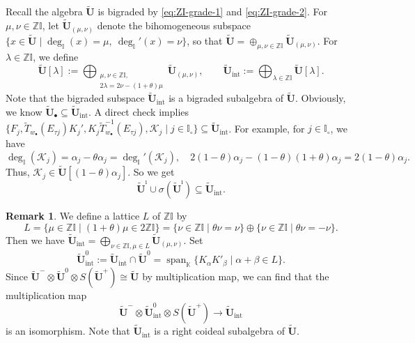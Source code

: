 \documentclass[a4paper,reqno,12pt]{amsart}
\numberwithin{equation}{section}
\theoremstyle{definition}
\newtheorem{remark}[proposition]{Remark}
\theoremstyle{plain}
\theoremstyle{definition}
\def\K{\mathbb K}
\def\Z{\mathbb Z}
\def\I{\mathbb I}
\def\wI{\I_\circ}
\def\bw{w_\bullet}
\def\tU{\widetilde{\mathbf U}}
\def\tUi{\widetilde{\mathbf U}^{\imath}}
\def \tbU{\tU_{\bullet}}
\def\tTD{\widetilde T}
\def\cK{\mathcal K}
\newcommand{\Span}{\operatorname{span}}
\begin{document}
Recall the algebra $\tU$ is bigraded by \eqref{eq:ZI-grade-1} and \eqref{eq:ZI-grade-2}. For $\mu,\nu\in\Z\I$, let $\tU_{(\mu,\nu)}$ denote the bihomogeneous subspace $\{x\in\tU\mid \deg_\I(x)=\mu,\ \deg_\I'(x)=\nu\}$, so that $\tU=\oplus_{\mu,\nu\in\Z\I} \tU_{(\mu,\nu)}$. For $\lambda\in\Z\I$, we define
\begin{equation}\label{eq:sum of bigraded subspace and int subalge}
  \tU[\lambda]:=\bigoplus_{\substack{\mu,\nu\in\Z\I,\\2\lambda=2\nu-(1+\theta)\mu}}\tU_{(\mu,\nu)},\qquad \tU_{\text{int}}:=\bigoplus_{\lambda\in\Z\I}\tU[\lambda].
\end{equation}
Note that the bigraded subspace $\tU_{\text{int}}$ is a bigraded subalgebra of $\tU$. Obviously, we know $\tbU\subseteq\tU_{\text{int}}$. A direct check implies $\{F_j,\tTD_{\bw}( E_{\tau j}) K_j',K_j\tTD_{\bw}^{-1}( E_{\tau j}),\cK_j\mid j\in\wI \}\subseteq\tU_{\text{int}}$. For example, for $j\in\wI$, we have
\begin{equation*}
  \deg_\I(\cK_j)=\alpha_j-\theta\alpha_j=\deg_\I'(\cK_j), \quad 2(1-\theta)\alpha_j-(1-\theta)(1+\theta)\alpha_j=2(1-\theta)\alpha_j.
\end{equation*}
Thus, $\cK_j\in\tU[(1-\theta)\alpha_j]$. So we get
\begin{equation}\label{eq:Ui and sigmaUi in Uint}
    \tUi\cup\sigma(\tUi)\subseteq\tU_{\text{int}}.
\end{equation}
\begin{remark}
    We define a lattice $L$ of $\Z\I$ by
    \begin{equation*}
      L=\{\mu\in\Z\I\mid (1+\theta)\mu\in2\Z\I\}=\{\nu\in\Z\I\mid \theta\nu=\nu\}\oplus\{\nu\in\Z\I\mid \theta\nu=-\nu\}.  
    \end{equation*}
    Then we have $\tU_{\text{int}}=\bigoplus_{\nu\in\Z\I,\mu\in L}\tU_{(\mu,\nu)}$. Set
    \begin{equation*}
      \tU_{\text{int}}^0:= \tU_{\text{int}}\cap\tU^0=\Span_{\K}\{K_\alpha K'_\beta\mid\alpha+\beta\in L\}. 
    \end{equation*}
    Since $\tU^-\otimes\tU^0\otimes S(\tU^+)\cong\tU$ by multiplication map, we can find that the multiplication map
    \begin{equation}\label{eq:structure of U-int}
     \tU^-\otimes\tU_{\text{int}}^0\otimes S(\tU^+)\longrightarrow\tU_{\text{int}}   
    \end{equation}
    is an isomorphism. Note that $\tU_{\text{int}}$ is a right coideal subalgebra of $\tU$.
\end{remark}
\end{document}
